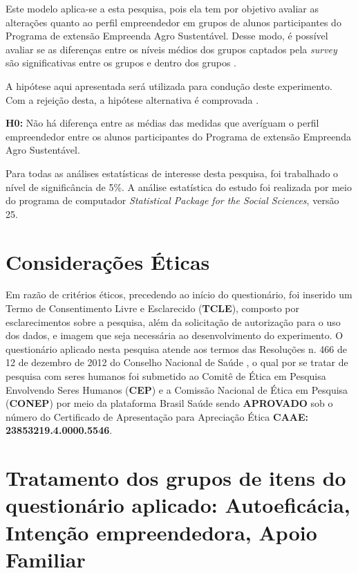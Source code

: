 Este modelo aplica-se a esta pesquisa, pois ela tem por objetivo avaliar as alterações quanto ao perfil empreendedor em grupos de alunos participantes do Programa de extensão Empreenda Agro Sustentável. Desse modo, é possível avaliar se as diferenças entre os níveis médios dos grupos captados pela \textit{survey} são significativas entre os grupos e dentro dos grupos \cite{rocha_avaliacao_2014}. 

A hipótese aqui apresentada será utilizada para condução deste experimento. Com a rejeição desta, a hipótese alternativa é comprovada \cite{hair_alise_2009}.

\textbf{H0:} Não há diferença entre as médias das medidas que averíguam o perfil empreendedor entre os alunos participantes do Programa de extensão Empreenda Agro Sustentável.


Para todas as análises estatísticas de interesse desta pesquisa, foi trabalhado o nível de significância de 5\%. A análise estatística do estudo foi realizada por meio do programa de computador \textit{Statistical Package for the Social Sciences}, \cite{ibm_corp_ibm_2017} versão 25. 


\section{Considerações Éticas}

Em razão de critérios éticos, precedendo ao início do questionário, foi inserido um Termo de Consentimento Livre e Esclarecido (\textbf{TCLE}), composto por esclarecimentos sobre a pesquisa, além da solicitação de autorização para o uso dos dados, e imagem que seja necessária ao desenvolvimento do experimento. O questionário aplicado nesta pesquisa atende aos termos das Resoluções n. 466 de 12 de dezembro de 2012 do Conselho Nacional de Saúde \cite{cns_resolucao_2012}, o qual por se tratar de pesquisa com seres humanos foi submetido ao Comitê de Ética em Pesquisa Envolvendo Seres Humanos (\textbf{CEP}) e a Comissão Nacional de Ética em Pesquisa (\textbf{CONEP}) por meio da plataforma Brasil Saúde sendo \textbf{APROVADO} sob o número do Certificado de Apresentação para Apreciação Ética \textbf{CAAE: 23853219.4.0000.5546}.


\section{Tratamento dos grupos de itens do questionário aplicado: Autoeficácia, Intenção empreendedora, Apoio Familiar}

